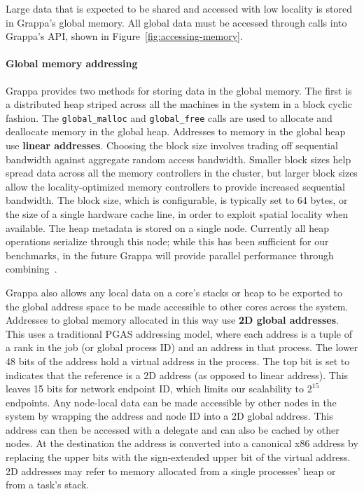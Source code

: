 Large data that is expected to be shared and accessed with low locality is stored in Grappa's global memory. All global data must be accessed through calls into Grappa's API, shown in Figure~\ref{fig:accessing-memory}.

\paragraph{Global memory addressing} Grappa provides two methods for storing data in the global memory. The first is a distributed heap striped across all the machines in the system in a block cyclic fashion. The \texttt{global\_malloc} and \texttt{global\_free} calls are used to allocate and deallocate memory in the global heap.  Addresses to memory in the global heap use \textbf{linear addresses}.  Choosing the block size involves trading off sequential bandwidth against aggregate random access bandwidth. Smaller block sizes help spread data across all the memory controllers in the cluster, but larger block sizes allow the locality-optimized memory controllers to provide increased sequential bandwidth. The block size, which is configurable, is typically set to 64 bytes, or the size of a single hardware cache line, in order to exploit spatial locality when available. The heap metadata is stored on a single node. Currently all heap operations serialize through this node; while this has been sufficient for our benchmarks, in the future Grappa will provide parallel performance through combining~\cite{MAMA,flatcombining}.

Grappa also allows any local data on a core's stacks or heap to be exported to the global address space to be made accessible to other cores across the system. Addresses to global memory allocated in this way use \textbf{2D global addresses}.  This uses a traditional PGAS addressing model, where each address is a tuple of a rank in the job (or global process ID) and an address in that process. The lower 48 bits of the address hold a virtual address in the process. The top bit is set to indicates that the reference is a 2D address (as opposed to linear address). This leaves 15 bits for network endpoint ID, which limits our scalability to $2^{15}$ endpoints. Any node-local data can be made accessible by other nodes in the system by wrapping the address and node ID into a 2D global address. This address can then be accessed with a delegate and can also be cached by other nodes. At the destination the address is converted into a canonical x86 address by replacing the upper bits with the sign-extended upper bit of the virtual address. 2D addresses may refer to memory allocated from a single processes' heap or from a task's stack.

